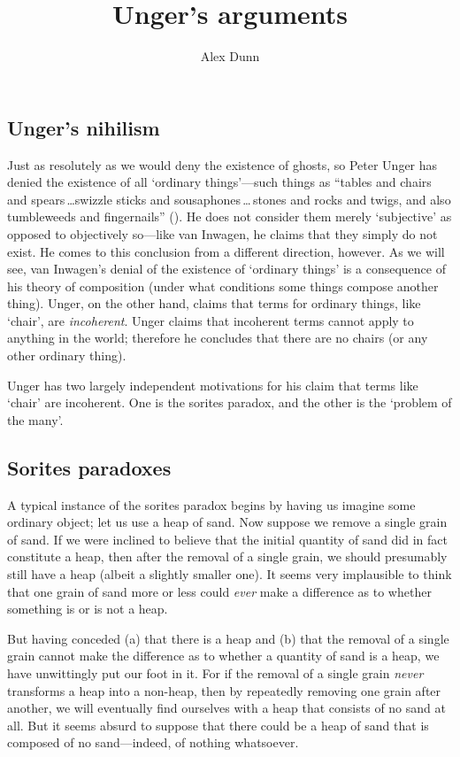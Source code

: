\documentclass[11pt]{standalone} \newif\ifstandlone \standalonetrue
\title{Unger's arguments}
\author{Alex Dunn}
\begin{document}
\ifstandalone
\maketitle
\begin{spacing}{1.5}
\fi

\section{Unger's nihilism}
\label{unger}
Just as resolutely as we would deny the existence of ghosts, so Peter
Unger has denied the existence of all `ordinary things'---such things
as ``tables and chairs and spears\,\ldots swizzle sticks and
sousaphones\,\ldots\,stones and rocks and twigs, and also tumbleweeds
and fingernails'' (\citeyear[117]{unger1979}).  He does not consider
them merely `subjective' as opposed to objectively so---like van
Inwagen, he claims that they simply do not exist.  He comes to this
conclusion from a different direction, however.  As we will see, van
Inwagen's denial of the existence of `ordinary things' is a
consequence of his theory of composition (under what conditions some
things compose another thing).  Unger, on the other hand, claims that
terms for ordinary things, like `chair', are {\em incoherent}.  Unger
claims that incoherent terms cannot apply to anything in the world;
therefore he concludes that there are no chairs (or any other ordinary
thing).

Unger has two largely independent motivations for his claim that terms
like `chair' are incoherent.  One is the sorites paradox, and the
other is the `problem of the many'.

\subsection{Sorites paradoxes}
\label{sorites}
A typical instance of the sorites paradox begins by having us imagine
some ordinary object; let us use a heap of sand.  Now suppose we
remove a single grain of sand.  If we were inclined to believe that
the initial quantity of sand did in fact constitute a heap, then after
the removal of a single grain, we should presumably still have a heap
(albeit a slightly smaller one).  It seems very implausible to think
that one grain of sand more or less could {\em ever} make a difference
as to whether something is or is not a heap.

But having conceded (a) that there is a heap and (b) that the removal
of a single grain cannot make the difference as to whether a quantity
of sand is a heap, we have unwittingly put our foot in it.  For if the
removal of a single grain {\em never} transforms a heap into a
non-heap, then by repeatedly removing one grain after another, we will
eventually find ourselves with a heap that consists of no sand at
all.  But it seems absurd to suppose that there could be a heap of
sand that is composed of no sand---indeed, of nothing whatsoever.


\end{spacing}
\end{document}
